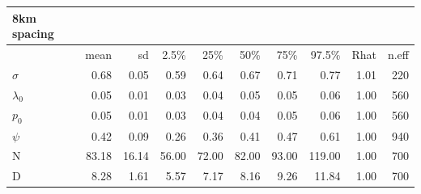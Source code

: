 \begin{table}[ht]
\begin{tabular}{l r r r r r r r r r}
  \hline
  8km spacing & & & & & & & & &\\
  \hline
  &   mean &   sd &  2.5\% &  25\% &  50\% &  75\% &  97.5\% &  Rhat &
  n.eff \\ \hline 
  $\sigma$ & 0.68 & 0.05 & 0.59 & 0.64 & 0.67 & 0.71 &  0.77 & 1.01 &  220 \\
  $\lambda_0$ &  0.05 & 0.01 & 0.03 & 0.04 & 0.05 & 0.05 &  0.06 & 1.00 &  560 \\
  $p_0$  &   0.05 & 0.01 & 0.03 & 0.04 & 0.04 & 0.05 &  0.06 & 1.00 &  560 \\
  $\psi$  &  0.42 & 0.09 & 0.26 & 0.36 & 0.41 & 0.47 &  0.61 & 1.00 &  940 \\
  N  &   83.18 & 16.14 & 56.00 & 72.00 & 82.00 & 93.00 & 119.00 & 1.00 &  700 \\
  D   &   8.28 & 1.61 & 5.57 & 7.17 & 8.16 & 9.26 & 11.84 & 1.00 &  700 \\
  \hline
\end{tabular}
\label{scr0.tab.wolvgrids}
\end{table}


